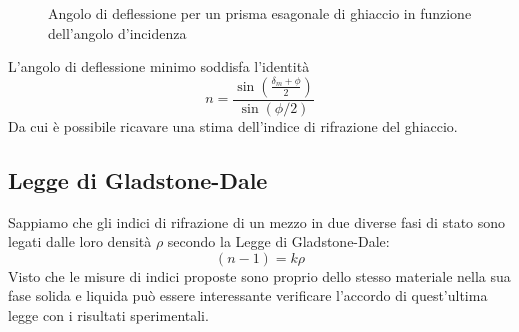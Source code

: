 \documentclass{report}[a4paper,11pt]
\begin{document}
\begin{figure}[!htb]
	\centering
		\scalebox{0.8}{}
	\caption{Angolo di deflessione per un prisma esagonale di ghiaccio in funzione dell'angolo d'incidenza \label{fig:delta_ice}}
\end{figure}
L'angolo di deflessione minimo soddisfa l'identità
\begin{equation}\label{eq:prism}
n = \frac{\sin\left(\frac{\delta_m + \phi}{2}\right)}{\sin (\phi/2)}
\end{equation}
Da cui è possibile ricavare una stima dell'indice di rifrazione del ghiaccio.
\subsection{Legge di Gladstone-Dale}
Sappiamo che gli indici di rifrazione di un mezzo in due diverse fasi di stato sono legati dalle loro densità $\rho$ secondo la Legge di Gladstone-Dale:
\begin{equation}\label{eq:Glad}
(n-1) = k \rho
\end{equation}
Visto che le misure di indici proposte sono proprio dello stesso materiale nella sua fase solida e liquida può essere interessante verificare l'accordo di quest'ultima legge con i risultati sperimentali.
\end{document}
